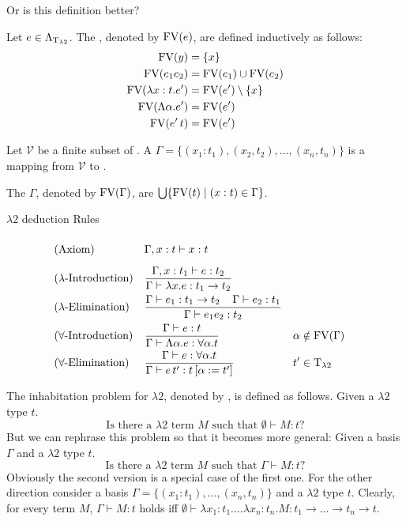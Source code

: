 Or is this definition better?
\begin{definition}
	Let $e\in\Lambda_{\text{T}_{\lambda2}}$. The , denoted by $\text{FV}(e)$, are defined inductively as follows:
	\begin{align*}
		\text{FV}(y)                & =\{x\}                 \\
		\text{FV}(e_1e_2)           & =\text{FV}(e_1)\cup\text{FV}(e_2)  \\
		\text{FV}(\lambda x:t.e')   & =\text{FV}(e')\setminus\{x\} \\
		\text{FV}(\Lambda\alpha.e') & =\text{FV}(e')               \\
		\text{FV}(e'\,t)            & =\text{FV}(e')               \\
	\end{align*}
\end{definition}
\begin{definition} Let $\mathcal{V}$ be a finite subset of \lambdaTypVar{}.	A  $\Gamma=\{(x_1:t_1),(x_2,t_2),\dots,(x_n,t_n)\}$ is a mapping from $\mathcal{V}$ to \lambdaTypes{}.

The  $\Gamma$, denoted by $\text{FV}(\Gamma)$, are $\bigcup\{\text{FV}(t)\mid(x:t)\in\Gamma\}$.
\end{definition}
$\lambda2$ deduction Rules
\begin{mdframed} 
	\begingroup
	\addtolength{\jot}{0.3cm}
	\begin{align*}
		&(\text{Axiom}) &&\Gamma,x:t\vdash x:t\vphantom{\frac{t_1}{t_1}}\\
		&(\lambda\text{-Introduction}) &&\frac{\Gamma,x:t_1\vdash e:t_2}{\Gamma\vdash \lambda x.e:t_1\to t_2}\\
		&(\lambda\text{-Elimination}) &&\frac{\Gamma\vdash e_1:t_1\to t_2 \hspace{0.4cm}\Gamma\vdash e_2:t_1}{\Gamma\vdash e_1e_2:t_2}\\
& (\forall\text{-Introduction}) &   & \frac{\Gamma\vdash e:t}{\Gamma\vdash \Lambda\alpha.e:\forall\alpha.t}                 &   & \alpha\notin\FV(\Gamma) \\
& (\forall\text{-Elimination})  &   & \frac{\Gamma\vdash e:\forall\alpha.t }{\Gamma\vdash e\,t':t\left[ \alpha:=t'\right] } &   & t'\in\lambdaTypes %
	\end{align*}
	\endgroup
\end{mdframed}

\begin{definition}
The inhabitation problem for $\lambda2$, denoted by \lambdaInhab, is defined as follows. Given a $\lambda2$ type $t$.
\[\text{Is there a $\lambda2$ term $M$ such that } \emptyset\vdash M:t?\]
But we can rephrase this problem so that it becomes more general:
Given a basis $\Gamma$ and a $\lambda2$ type $t$.
\[\text{Is there a $\lambda2$ term $M$ such that } \Gamma\vdash M:t?\]
Obviously the second version is a special case of the first one. For the other direction consider a basis $\Gamma=\{(x_1:t_1),\dots,(x_n,t_n)\}$ and a $\lambda2$ type $t$. Clearly, for every term $M$, $\Gamma\vdash M:t$ holds iff $\emptyset\vdash \lambda x_1:t_1.\dots\lambda x_n:t_n.M:t_1\to\dots\to t_n\to t$.
\end{definition}
